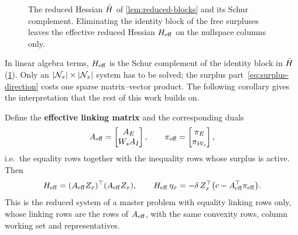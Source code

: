 \begin{figure}[ht]
\centering
{}
\caption{The reduced Hessian $\bar{H}$ of \cref{lem:reduced-blocks} and its Schur complement.
Eliminating the identity block of the free surpluses leaves the effective reduced Hessian
$H_{\mathrm{eff}}$ on the nullspace columns only.}
\label{fig:schur}
\end{figure}

In linear algebra terms, $H_{\mathrm{eff}}$ is the Schur complement of the identity block in $\bar{H}$
(\cref{fig:schur}). Only an $|\mathcal{N}_x|\times|\mathcal{N}_x|$ system has to be solved; the surplus
part~\eqref{eq:surplus-direction} costs one sparse matrix--vector product. The following
corollary gives the interpretation that the rest of this work builds on.

\begin{cor} \label{cor:Aeff}
Define the \textbf{effective linking matrix} and the corresponding duals
\[
A_{\mathrm{eff}} = \begin{bmatrix} A_E\\ W_sA_I\end{bmatrix},\qquad
\pi_{\mathrm{eff}} = \begin{bmatrix}\pi_E\\ \pi_{\mathcal{W}_s}\end{bmatrix},
\]
i.e.\ the equality rows together with the inequality rows whose surplus is active. Then
\begin{equation} \label{eq:Heff-Aeff}
H_{\mathrm{eff}} = (A_{\mathrm{eff}} Z_x)^\top(A_{\mathrm{eff}} Z_x),\qquad
H_{\mathrm{eff}}\,\eta_x = -\delta\,Z_x^\top\bigl(c - A_{\mathrm{eff}}^\top\pi_{\mathrm{eff}}\bigr).
\end{equation}
This is the reduced system of a master problem with equality linking rows only, whose
linking rows are the rows of $A_{\mathrm{eff}}$, with the same convexity rows, column working set and
representatives.
\end{cor}

